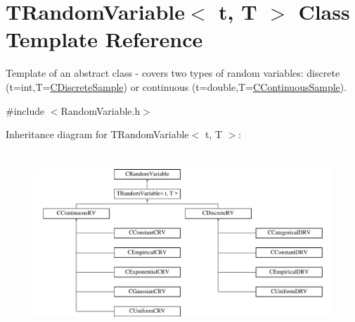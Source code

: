 \hypertarget{class_t_random_variable}{\section{T\-Random\-Variable$<$ t, T $>$ Class Template Reference}
\label{class_t_random_variable}
}


Template of an abstract class -\/ covers two types of random variables\-: discrete (t=int,T=\hyperlink{class_c_discrete_sample}{C\-Discrete\-Sample}) or continuous (t=double,T=\hyperlink{class_c_continuous_sample}{C\-Continuous\-Sample}).  




{\ttfamily \#include $<$Random\-Variable.\-h$>$}

Inheritance diagram for T\-Random\-Variable$<$ t, T $>$\-:\begin{figure}[H]
\begin{center}
\leavevmode
\includegraphics[height=6.871166cm]{class_t_random_variable}
\end{center}
\end{figure}
